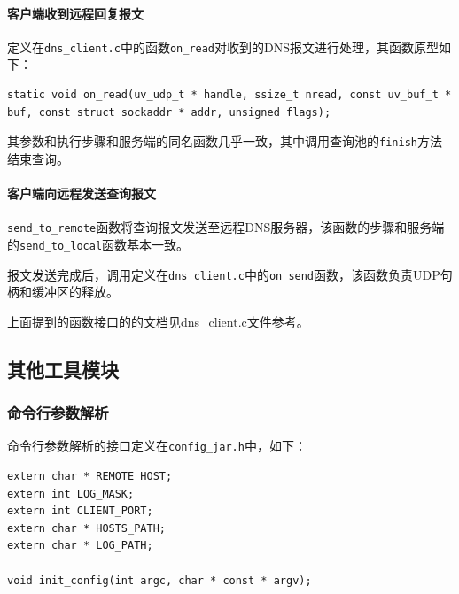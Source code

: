 \documentclass[lang=cn,11pt,a4paper,cite=authornum]{paper}
\begin{document}
\paragraph{客户端收到远程回复报文}

定义在\texttt{dns_client.c}中的函数\texttt{on_read}对收到的DNS报文进行处理，其函数原型如下：

\begin{code}
\begin{verbatim}
static void on_read(uv_udp_t * handle, ssize_t nread, const uv_buf_t * buf, const struct sockaddr * addr, unsigned flags);
\end{verbatim}
\end{code}

其参数和执行步骤和服务端的同名函数几乎一致，其中调用查询池的\texttt{finish}方法结束查询。

\paragraph{客户端向远程发送查询报文}

\texttt{send_to_remote}函数将查询报文发送至远程DNS服务器，该函数的步骤和服务端的\texttt{send_to_local}函数基本一致。

报文发送完成后，调用定义在\texttt{dns_client.c}中的\texttt{on_send}函数，该函数负责UDP句柄和缓冲区的释放。

上面提到的函数接口的的文档见\href{run:./APIdoc/dns__client_8c.html}{dns\_client.c文件参考}。

\subsection{其他工具模块}

\subsubsection{命令行参数解析}

命令行参数解析的接口定义在\texttt{config_jar.h}中，如下：

\begin{code}
\begin{verbatim}
extern char * REMOTE_HOST; 
extern int LOG_MASK; 
extern int CLIENT_PORT; 
extern char * HOSTS_PATH; 
extern char * LOG_PATH; 
 
void init_config(int argc, char * const * argv);
\end{verbatim}
\end{code}
\end{document}
